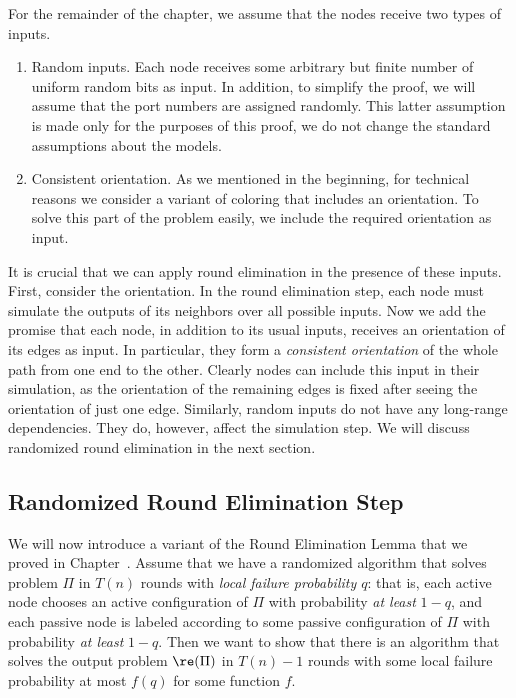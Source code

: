 For the remainder of the chapter, we assume that the nodes receive two types of inputs.
\begin{enumerate}
	\item Random inputs. Each node receives some arbitrary but finite number of uniform random bits as input. In addition, to simplify the proof, we will assume that the port numbers are assigned randomly. This latter assumption is made only for the purposes of this proof, we do not change the standard assumptions about the models.
	\item Consistent orientation. As we mentioned in the beginning, for technical reasons we consider a variant of coloring that includes an orientation. To solve this part of the problem easily, we include the required orientation as input.
\end{enumerate}
It is crucial that we can apply round elimination in the presence of these inputs. First, consider the orientation. In the round elimination step, each node must simulate the outputs of its neighbors over all possible inputs. Now we add the promise that each node, in addition to its usual inputs, receives an orientation of its edges as input. In particular, they form a \emph{consistent orientation} of the whole path from one end to the other. Clearly nodes can include this input in their simulation, as the orientation of the remaining edges is fixed after seeing the orientation of just one edge. Similarly, random inputs do not have any long-range dependencies. They do, however, affect the simulation step. We will discuss randomized round elimination in the next section.

\subsection{Randomized Round Elimination Step} \label{ssec:rand-re}

We will now introduce a variant of the Round Elimination Lemma that we proved in Chapter~. Assume that we have a randomized algorithm that solves problem $\Pi$ in $T(n)$ rounds with \emph{local failure probability $q$}: that is, each active node chooses an active configuration of $\Pi$ with probability \emph{at least} $1-q$, and each passive node is labeled according to some passive configuration of $\Pi$ with probability \emph{at least} $1-q$. Then we want to show that there is an algorithm that solves the output problem $\re(\Pi)$ in $T(n)-1$ rounds with some local failure probability at most $f(q)$ for some function $f$.

